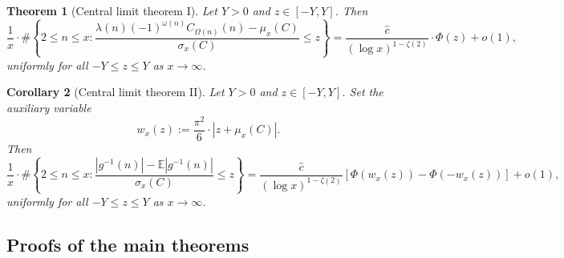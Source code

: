 \documentclass[11pt,reqno,a4letter]{article}
\numberwithin{figure}{section}
\numberwithin{table}{section}
\theoremstyle{plain}
\newtheorem{theorem}{Theorem}
\newtheorem{cor}[theorem]{Corollary}
\numberwithin{theorem}{section}
\theoremstyle{definition}
\begin{document}
\begin{theorem}[Central limit theorem I]
\label{theorem_CLT_VI} 
Let $Y > 0$ and $z \in [-Y, Y]$. Then 
\[
\frac{1}{x} \cdot \#\left\{2 \leq n \leq x: \frac{\lambda(n) (-1)^{\omega(n)} C_{\Omega(n)}(n) - 
     \mu_x(C)}{\sigma_x(C)} \leq z\right\} = 
     \frac{\widehat{c}}{(\log x)^{1-\zeta(2)}} \cdot \Phi(z) + o(1), 
\]
uniformly for all $-Y \leq z \leq Y$ as $x \rightarrow \infty$. 
\end{theorem} 

\begin{cor}[Central limit theorem II]
\label{cor_CLT_VII} 
Let $Y > 0$ and $z \in [-Y, Y]$. Set the auxiliary variable 
\[
w_x(z) := \frac{\pi^2}{6} \cdot \left\lvert z + \mu_x(C)\right\rvert. 
\]
Then 
\[
\frac{1}{x} \cdot \#\left\{2 \leq n \leq x: \frac{|g^{-1}(n)| - 
     \mathbb{E}|g^{-1}(n)|}{\sigma_x(C)} \leq z\right\} = 
     \frac{\widehat{c}}{(\log x)^{1-\zeta(2)}} \left[ 
     \Phi\left(w_x(z)\right) - \Phi\left(-w_x(z)\right) 
     \right] + o(1), 
\]
uniformly for all $-Y \leq z \leq Y$ as $x \rightarrow \infty$.
\end{cor} 

\subsection{Proofs of the main theorems} 
\end{document}
